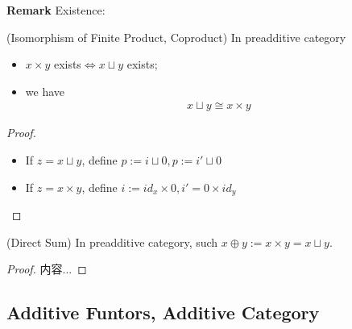 \documentclass[Total.tex]{subfiles}
\begin{document}
				\textbf{Remark} Existence:
				\begin{lemma}
					(Isomorphism of Finite Product, Coproduct) In preadditive category 
					\begin{itemize}
						\item $x\times y$ exists$\Leftrightarrow x\sqcup y$ exists;
						\item 
						 we have
						\begin{gather*}
							x\sqcup y\cong x\times y
						\end{gather*}
					\end{itemize}
				\end{lemma}
				\begin{proof}
					\begin{itemize}
						\item If $z=x\sqcup y$, define $p:=i\sqcup 0,p:=i'\sqcup 0$
						\item If $z=x\times y$, define $i:=id_x\times 0,i'=0\times id_y$
					\end{itemize}
					\begin{center}
					\end{center}
				\end{proof}
				\begin{Def}
					(Direct Sum) In preadditive category, such $x\oplus y:=x\times y=x\sqcup y$.
				\end{Def}
				
				\begin{lemma}
					
				\end{lemma}
				\begin{proof}
					内容...
				\end{proof}
			\subsection{Additive Funtors, Additive Category}
			
\end{document}
